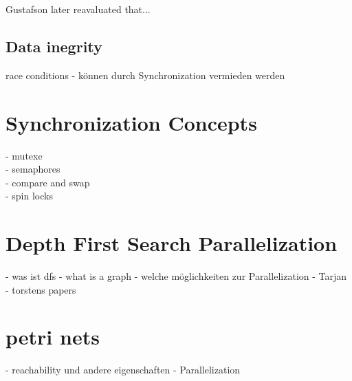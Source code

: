 Gustafson later reavaluated that... %

\subsection{Data inegrity}
race conditions
- können durch Synchronization vermieden werden

\section{Synchronization Concepts}
- mutexe\\
- semaphores\\
- compare and swap\\
- spin locks\\

\section{Depth First Search Parallelization}
- was ist dfs
- what is a graph
- welche möglichkeiten zur Parallelization
- Tarjan
- torstens papers

\section{petri nets}
- reachability und andere eigenschaften
- Parallelization

